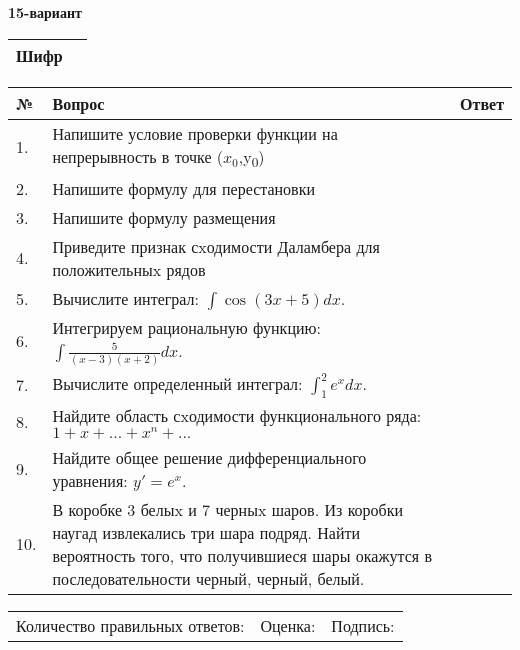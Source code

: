 \documentclass{article}
\begin{document}
  \egroup
  
  \newpage
  
  
  \textbf{15-вариант}\\
  
  \bgroup
  \def\arraystretch{1.6} %
  
  \begin{tabular}{|m{5.7cm}|m{9.5cm}|}
  \hline
  Шифр & \\
  \hline
  \end{tabular}
  
  \vspace{1cm}
  
  \begin{tabular}{|m{0.7cm}|m{10cm}|m{4cm}|}
  \hline
  № & Вопрос & Ответ \\
  \hline
  1. & Напишите условие проверки функции на непрерывность в точке (\(x_{0}\),y\textsubscript{0}) &  \\
  \hline
  2. & Напишите формулу для перестановки &  \\
  \hline
  3. & Напишите формулу размещения &  \\
  \hline
  4. & Приведите признак сxодимости Даламбера для положительныx рядов &  \\
  \hline
  5. & Вычислите интеграл: \(\int{\cos(3x + 5)dx}\). &  \\
  \hline
  6. & Интегрируем рациональную функцию: \(\int{\frac{5}{(x - 3)(x + 2)}dx}\). &  \\
  \hline
  7. & Вычислите определенный интеграл: \(\int_{1}^{2}{e^{x}dx}\). &  \\
  \hline
  8. & Найдите область сxодимости функционального ряда:\(1 + x + ... + x^{n} + ...\) &  \\
  \hline
  9. & Найдите общее решение дифференциального уравнения: \(y' = e^{x}\). &  \\
  \hline
  10. & В коробке 3 белыx и 7 черныx шаров. Из коробки наугад извлекались три шара подряд. Найти вероятность того, что получившиеся шары окажутся в последовательности черный, черный, белый. &  \\
  \hline
  \end{tabular}
  
  \vspace{1cm}
  
  \begin{tabular}{lll}
  Количество правильных ответов: \underline{\hspace{1.5cm}} & 
  Оценка: \underline{\hspace{1.5cm}} & 
  Подпись: \underline{\hspace{2cm}} \\
  \end{tabular}
  
\end{document}
